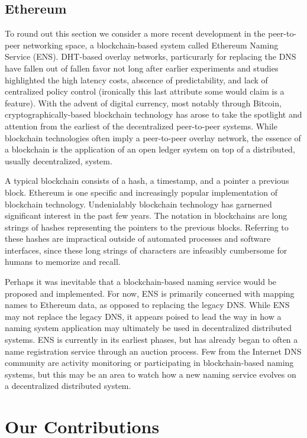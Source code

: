 \documentclass[sigconf]{acmart}
\begin{document}
\subsection{Ethereum}

To round out this section we consider a more recent development in the
peer-to-peer networking space, a blockchain-based system called Ethereum
Naming Service (ENS).\cite{johnson_ens_2017}  DHT-based overlay
networks, particurarly for replacing the DNS have fallen out of fallen
favor not long after earlier experiments and studies highlighted the
high latency costs, abscence of predictability, and lack of centralized
policy control (ironically this last attribute some would claim is a
feature).  With the advent of digital currency, most notably through
Bitcoin, cryptographically-based blockchain technology has arose to take
the spotlight and attention from the earliest of the decentralized
peer-to-peer systems.  While blockchain technologies often imply a
peer-to-peer overlay network, the essence of a blockchain is the
application of an open ledger system on top of a distributed, usually
decentralized, system.

A typical blockchain consists of a hash, a timestamp, and a pointer a
previous block.  Ethereum is one specific and increasingly popular
implementation of blockchain technology.  Undenialably blockchain
technology has garnerned significant interest in the past few years.
The notation in blockchains are long strings of hashes representing the
pointers to the previous blocks.  Referring to these hashes are
impractical outside of automated processes and software interfaces,
since these long strings of characters are infeasibly cumbersome for
humans to memorize and recall.

Perhaps it was inevitable that a blockchain-based naming service would
be proposed and implemented.  For now, ENS is primarily concerned with
mapping names to Ethereum data, as opposed to replacing the legacy DNS.
While ENS may not replace the legacy DNS, it appears poised to lead the
way in how a naming system application may ultimately be used in
decentralized distributed systems.  ENS is currently in its earliest
phases, but has already began to often a name registration service
through an auction process.  Few from the Internet DNS community are
activity monitoring or participating in blockchain-based naming systems,
but this may be an area to watch how a new naming service evolves on a
decentralized distributed system.

\section{Our Contributions}
\end{document}
